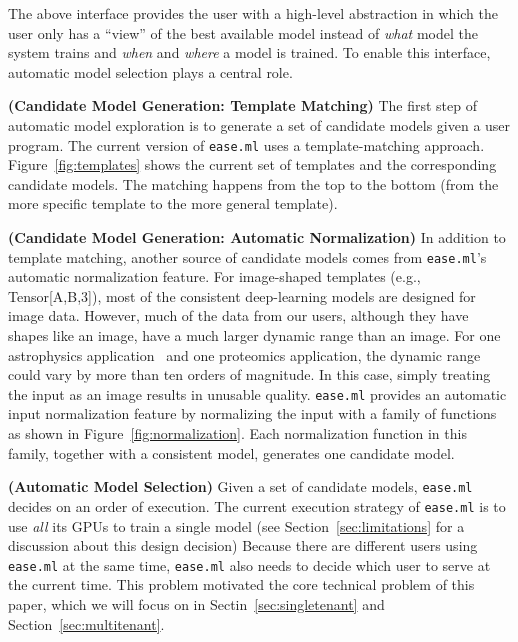 \documentclass[letterpaper]{vldb}
\newcommand{\eml}{\texttt{ease.ml}\xspace}
\begin{document}
The above interface provides the user with a high-level abstraction
in which the user only has a ``view'' of the best available model
instead of {\em what} model the system trains and 
{\em when} and {\em where} a model is trained. To enable 
this interface, automatic model selection plays a
central role.

\vspace{0.5em}
\noindent
{\bf (Candidate Model Generation: Template Matching)} 
The first step of automatic
model exploration is to generate a set of 
candidate models given a user program. The current
version of \eml uses a template-matching approach.
Figure~\ref{fig:templates} shows the current set of
templates and the corresponding candidate models. 
The matching happens from the top to the bottom 
(from the more specific template to the more general template).

\vspace{0.5em}
\noindent
{\bf (Candidate Model Generation: Automatic Normalization)} 
In addition to template matching, another source of candidate models 
comes from \eml's automatic normalization feature.
For image-shaped templates (e.g., Tensor[A,B,3]),
most of the consistent deep-learning models are designed for
image data. However, much of the data from our users, although
they have shapes like an image, have a much larger dynamic
range than an image. For one astrophysics application~\cite{Schawinski2017}
and one proteomics application, the dynamic range could
vary by more than ten orders of magnitude. In this case,
simply treating the input as an image results in unusable 
quality. \eml provides an automatic input
normalization feature by normalizing the input
with a family of functions as shown in Figure~\ref{fig:normalization}.
Each normalization function in this family, together with 
a consistent model, generates one  
candidate model.

\vspace{0.5em}
\noindent
{\bf (Automatic Model Selection)} 
Given a set of candidate models, \eml decides on an order of
execution. The current execution strategy of \eml is to 
use {\em all} its GPUs to train a single 
model (see Section~\ref{sec:limitations}
for a discussion about this design decision) Because there are different
users using \eml at the same time, \eml also needs
to decide which user to serve at the current time.
This problem motivated the core technical problem of this paper, which we will focus on in Sectin~\ref{sec:singletenant} and Section~\ref{sec:multitenant}.
\end{document}
